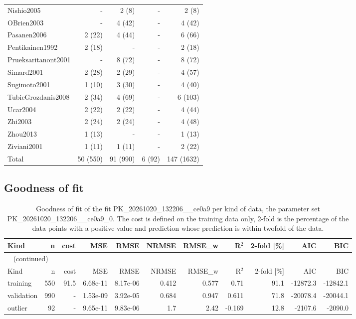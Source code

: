 \begin{longtable}{lrrrr}
Nishio2005 & - & 2 (8) & - & 2 (8) \\
OBrien2003 & - & 4 (42) & - & 4 (42) \\
Pasanen2006 & 2 (22) & 4 (44) & - & 6 (66) \\
Pentikainen1992 & 2 (18) & - & - & 2 (18) \\
Prueksaritanont2001 & - & 8 (72) & - & 8 (72) \\
Simard2001 & 2 (28) & 2 (29) & - & 4 (57) \\
Sugimoto2001 & 1 (10) & 3 (30) & - & 4 (40) \\
TubicGrozdanis2008 & 2 (34) & 4 (69) & - & 6 (103) \\
Ucar2004 & 2 (22) & 2 (22) & - & 4 (44) \\
Zhi2003 & 2 (24) & 2 (24) & - & 4 (48) \\
Zhou2013 & 1 (13) & - & - & 1 (13) \\
Ziviani2001 & 1 (11) & 1 (11) & - & 2 (22) \\
Total & 50 (550) & 91 (990) & 6 (92) & 147 (1632) \\
\end{longtable}

\subsection{Goodness of fit}

\begin{longtable}{lrrrrrrrrrr}
\caption{Goodness of fit of the fit PK\_20261020\_132206\_\_ce0a9 per kind of data, the parameter set PK\_20261020\_132206\_\_ce0a9\_0. The cost is defined on the training data only, 2-fold is the percentage of the data points with a positive value and prediction whose prediction is within twofold of the data.}\label{tab:metrics:PK_20261020_132206__ce0a9} \\
\toprule
Kind & n & cost & MSE & RMSE & NRMSE & RMSE\_w & R\ensuremath{^{2}} & 2-fold [\%] & AIC & BIC \\
\midrule
\endfirsthead
\multicolumn{11}{l}{\small\tablename~\thetable{} (continued)} \\
\toprule
Kind & n & cost & MSE & RMSE & NRMSE & RMSE\_w & R\ensuremath{^{2}} & 2-fold [\%] & AIC & BIC \\
\midrule
\endhead
\bottomrule
\endlastfoot
training & 550 & 91.5 & 6.68e-11 & 8.17e-06 & 0.412 & 0.577 & 0.71 & 91.1 & -12872.3 & -12842.1 \\
validation & 990 & - & 1.53e-09 & 3.92e-05 & 0.684 & 0.947 & 0.611 & 71.8 & -20078.4 & -20044.1 \\
outlier & 92 & - & 9.65e-11 & 9.83e-06 & 1.7 & 2.42 & -0.169 & 12.8 & -2107.6 & -2090.0 \\
\end{longtable}

